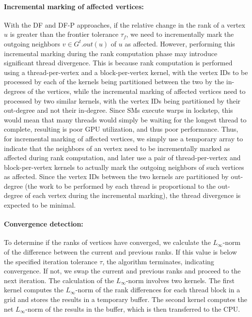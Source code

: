 \paragraph{Incremental marking of affected vertices:}

With the DF and DF-P approaches, if the relative change in the rank of a vertex $u$ is greater than the frontier tolerance $\tau_f$, we need to incrementally mark the outgoing neighbors $v \in G^t.out(u)$ of $u$ as affected. However, performing this incremental marking during the rank computation phase may introduce significant thread divergence. This is because rank computation is performed using a thread-per-vertex and a block-per-vertex kernel, with the vertex IDs to be processed by each of the kernels being partitioned between the two by the in-degrees of the vertices, while the incremental marking of affected vertices need to processed by two similar kernels, with the vertex IDs being partitioned by their out-degree and not their in-degree. Since SMs execute warps in lockstep, this would mean that many threads would simply be waiting for the longest thread to complete, resulting is poor GPU utilization, and thus poor performance. Thus, for incremental marking of affected vertices, we simply use a temporary array to indicate that the neighbors of an vertex need to be incrementally marked as affected during rank computation, and later use a pair of thread-per-vertex and block-per-vertex kernels to actually mark the outgoing neighbors of such vertices as affected. Since the vertex IDs between the two kernels are partitioned by out-degree (the work to be performed by each thread is proportional to the out-degree of each vertex during the incremental marking), the thread divergence is expected to be minimal.

\paragraph{Convergence detection:}

To determine if the ranks of vertices have converged, we calculate the $L_\infty$-norm of the difference between the current and previous ranks. If this value is below the specified iteration tolerance $\tau$, the algorithm terminates, indicating convergence. If not, we swap the current and previous ranks and proceed to the next iteration. The calculation of the $L_\infty$-norm involves two kernels. The first kernel computes the $L_\infty$-norm of the rank differences for each thread block in a grid and stores the results in a temporary buffer. The second kernel computes the net $L_\infty$-norm of the results in the buffer, which is then transferred to the CPU.

